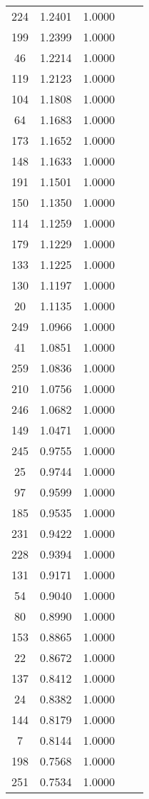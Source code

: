 \documentclass[12pt]{article}\usepackage[]{graphicx}\usepackage[]{color}
\begin{document}
\begin{longtable}[c]{ccccc}
	224	& 1.2401 & 1.0000 & & \\
	199	& 1.2399 & 1.0000 & & \\
	46	& 1.2214 & 1.0000 & & \\
	119	& 1.2123 & 1.0000 & & \\
	104	& 1.1808 & 1.0000 & & \\
	64	& 1.1683 & 1.0000 & & \\
	173	& 1.1652 & 1.0000 & & \\
	148	& 1.1633 & 1.0000 & & \\
	191	& 1.1501 & 1.0000 & & \\
	150	& 1.1350 & 1.0000 & & \\
	114	& 1.1259 & 1.0000 & & \\
	179	& 1.1229 & 1.0000 & & \\
	133	& 1.1225 & 1.0000 & & \\
	130	& 1.1197 & 1.0000 & & \\
	20	& 1.1135 & 1.0000 & & \\
	249	& 1.0966 & 1.0000 & & \\
	41	& 1.0851 & 1.0000 & & \\
	259	& 1.0836 & 1.0000 & & \\
	210	& 1.0756 & 1.0000 & & \\
	246	& 1.0682 & 1.0000 & & \\
	149	& 1.0471 & 1.0000 & & \\
	245	& 0.9755 & 1.0000 & & \\
	25	& 0.9744 & 1.0000 & & \\
	97	& 0.9599 & 1.0000 & & \\
	185	& 0.9535 & 1.0000 & & \\
	231	& 0.9422 & 1.0000 & & \\
	228	& 0.9394 & 1.0000 & & \\
	131	& 0.9171 & 1.0000 & & \\
	54	& 0.9040 & 1.0000 & & \\
	80	& 0.8990 & 1.0000 & & \\
	153	& 0.8865 & 1.0000 & & \\
	22	& 0.8672 & 1.0000 & & \\
	137	& 0.8412 & 1.0000 & & \\
	24	& 0.8382 & 1.0000 & & \\
	144	& 0.8179 & 1.0000 & & \\
	7	& 0.8144 & 1.0000 & & \\
	198	& 0.7568 & 1.0000 & & \\
	251	& 0.7534 & 1.0000 & & \\

\end{longtable}
\end{document}
